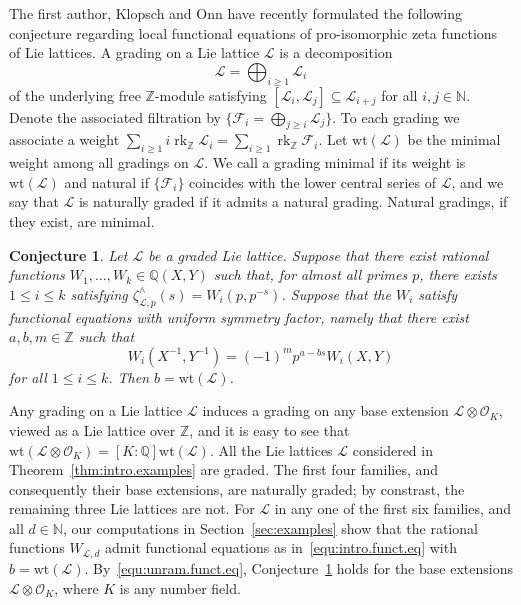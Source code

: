 \documentclass[11pt,a4paper]{amsart}
\theoremstyle{plain}
\newtheorem{con}[thm]{Conjecture}
\theoremstyle{remark}
\newcommand{\N}{\mathbb{N}}
\newcommand{\Z}{\mathbb{Z}}
\newcommand{\Q}{\mathbb{Q}}
\newcommand{\tensor}{\otimes}
\DeclareMathOperator{\rk}{rk}
\begin{document}
The first author, Klopsch and Onn have recently formulated the following conjecture regarding local functional equations of pro-isomorphic zeta functions of Lie lattices.  A grading on a Lie lattice $\mathcal{L}$ is a decomposition
$$ \mathcal{L} = \bigoplus_{i \geq 1} \mathcal{L}_i$$
of the underlying free $\Z$-module satisfying $[\mathcal{L}_i, \mathcal{L}_j] \subseteq \mathcal{L}_{i+j}$ for all $i,j \in \N$.  Denote the associated filtration by $\{ \mathcal{F}_i = \bigoplus_{j \geq i} \mathcal{L}_j \}$.  To each grading we associate a weight $\sum_{i\geq 1} i\rk_\Z \mathcal{L}_i = \sum_{i \geq 1} \rk_\Z \mathcal{F}_i$.  Let $\mathrm{wt}(\mathcal{L})$ be the minimal weight among all gradings on $\mathcal{L}$.  We call a grading minimal if its weight is $\mathrm{wt}(\mathcal{L})$ and natural if $\{ \mathcal{F}_i \}$ coincides with the lower central series of $\mathcal{L}$, and we say that $\mathcal{L}$ is naturally graded if it admits a natural grading.  Natural gradings, if they exist, are minimal.

\begin{con} \label{graded.conj}\cite[Conjecture~1.3]{BKO/even}
Let $\mathcal{L}$ be a graded Lie lattice.  Suppose that there exist rational functions $W_1, \dots, W_k \in \Q(X,Y)$ such that, for almost all primes $p$, there exists $1 \leq i \leq k$ satisfying $\zeta^\wedge_{\mathcal{L},p}(s) = W_i(p,p^{-s})$.  
Suppose that the $W_i$ satisfy functional equations with uniform symmetry factor, namely that
there exist $a,b,m \in \Z$ such that 
\begin{equation} \label{equ:intro.funct.eq}
W_i(X^{-1}, Y^{-1}) = (-1)^{m} p^{a - b s} W_i(X,Y)
\end{equation}
for all $1 \leq i \leq k$.  Then $b = \mathrm{wt}(\mathcal{L})$.	
\end{con}

 Any grading on a Lie lattice $\mathcal{L}$ induces a grading on any base extension $\mathcal{L} \tensor \mathcal{O}_K$, viewed as a Lie lattice over $\Z$, and it is easy to see that $\mathrm{wt}(\mathcal{L} \tensor \mathcal{O}_K) = [K:\Q] \mathrm{wt}(\mathcal{L})$.  All the Lie lattices $\mathcal{L}$ considered in Theorem~\ref{thm:intro.examples} are graded.  The first four families, and consequently their base extensions, are naturally graded; by constrast, the remaining three Lie lattices are not.  For $\mathcal{L}$ in any one of the first six families,  
 and all $d \in \N$, our computations in Section~\ref{sec:examples} show that the rational functions $W_{\mathcal{L},d}$ admit functional equations as in~\eqref{equ:intro.funct.eq} with $b = \mathrm{wt}(\mathcal{L})$.    By~\eqref{equ:unram.funct.eq}, Conjecture~\ref{graded.conj} holds for the base extensions $\mathcal{L} \tensor \mathcal{O}_K$, where $K$ is any number field. 
\end{document}
